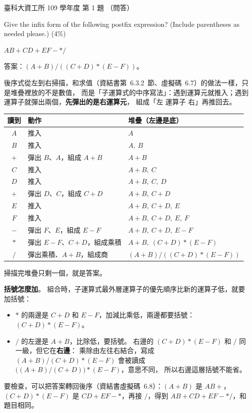 \begin{pastexam}[label={px:ntust-109-ice-01}]{臺科大資工所 109 學年度 第 1 題}
（問答）

Give the infix form of the following postfix expression? (Include parentheses as needed please.)
(4\%)

\quad $AB+CD+EF-*/$
\end{pastexam}

\begin{pastsoln}
答案：$(A+B)/((C+D)*(E-F))$。

後序式從左到右掃描，和求值（資結書第~6.3.2~節、虛擬碼~6.7）的做法一樣，只是堆疊裡放的不是數值，
而是「子運算式的中序寫法」：遇到運算元就推入；遇到運算子就彈出兩個，\textbf{先彈出的是右運算元}，
組成「左 運算子 右」再推回去。
\begin{center}
\begin{tabular}{cll}
\toprule
讀到 & 動作 & 堆疊（左邊是底） \\
\midrule
$A$ & 推入 & $A$ \\
$B$ & 推入 & $A,\ B$ \\
$+$ & 彈出 $B$、$A$，組成 $A+B$ & $A+B$ \\
$C$ & 推入 & $A+B,\ C$ \\
$D$ & 推入 & $A+B,\ C,\ D$ \\
$+$ & 彈出 $D$、$C$，組成 $C+D$ & $A+B,\ C+D$ \\
$E$ & 推入 & $A+B,\ C+D,\ E$ \\
$F$ & 推入 & $A+B,\ C+D,\ E,\ F$ \\
$-$ & 彈出 $F$、$E$，組成 $E-F$ & $A+B,\ C+D,\ E-F$ \\
$*$ & 彈出 $E-F$、$C+D$，組成乘積 & $A+B,\ (C+D)*(E-F)$ \\
$/$ & 彈出乘積、$A+B$，組成商 & $(A+B)/((C+D)*(E-F))$ \\
\bottomrule
\end{tabular}
\end{center}
掃描完堆疊只剩一個，就是答案。

\textbf{括號怎麼加}。 組合時，子運算式最外層運算子的優先順序比新的運算子低，就要加括號：
\begin{itemize}
\item $*$ 的兩邊是 $C+D$ 和 $E-F$，加減比乘低，兩邊都要括號：$(C+D)*(E-F)$。
\item $/$ 的左邊是 $A+B$，比除低，要括號。 右邊的 $(C+D)*(E-F)$ 和 $/$ 同一級，但它在\textbf{右邊}：
乘除由左往右結合，寫成 $(A+B)/(C+D)*(E-F)$ 會被讀成 $\bigl((A+B)/(C+D)\bigr)*(E-F)$，意思不同，
所以右邊這層括號不能省。
\end{itemize}
要檢查，可以把答案轉回後序（資結書虛擬碼~6.8）：$(A+B)$ 是 $AB+$，$(C+D)*(E-F)$ 是
$CD+EF-*$，再接 $/$，得到 $AB+CD+EF-*/$，和題目相同。
\end{pastsoln}
